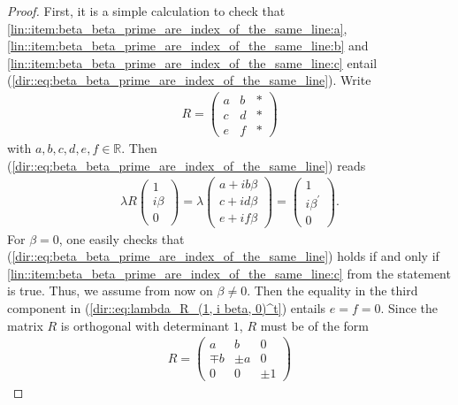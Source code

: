 \documentclass{amsart}
\newcommand{\R}{\mathbb{R}}
\begin{document}
\begin{proof}
    First, it is a simple calculation to check that \ref{lin::item:beta_beta_prime_are_index_of_the_same_line:a}, \ref{lin::item:beta_beta_prime_are_index_of_the_same_line:b} and \ref{lin::item:beta_beta_prime_are_index_of_the_same_line:c} entail (\ref{dir::eq:beta_beta_prime_are_index_of_the_same_line}). Write 
    \begin{align*}
        R = \begin{pmatrix}
            a & b & * \\
            c & d & * \\
            e & f & *
        \end{pmatrix}
    \end{align*}
    with $a, b, c, d, e, f \in \R$. Then (\ref{dir::eq:beta_beta_prime_are_index_of_the_same_line}) reads
    \begin{align} \label{dir::eq:lambda_R_(1, i beta, 0)^t}
        \lambda R \begin{pmatrix}
            1 \\ i \beta \\ 0
        \end{pmatrix}
        = \lambda \begin{pmatrix}
            a + i b \beta \\ c + i d \beta \\ e + if \beta
        \end{pmatrix}
        = \begin{pmatrix}
            1 \\ i \beta^\prime \\ 0
        \end{pmatrix}.
    \end{align}
    For $\beta = 0$, one easily checks that (\ref{dir::eq:beta_beta_prime_are_index_of_the_same_line}) holds if and only if \ref{lin::item:beta_beta_prime_are_index_of_the_same_line:c} from the statement is true.
    Thus, we assume from now on $\beta \neq 0$. Then the equality in the third component in (\ref{dir::eq:lambda_R_(1, i beta, 0)^t}) entails $e = f = 0$. Since the matrix $R$ is orthogonal with determinant $1$, $R$ must be of the form
    \begin{align*}
        R = \begin{pmatrix}
             a & b & 0 \\
            \mp b & \pm a & 0 \\
            0 & 0 & \pm 1
        \end{pmatrix}

\end{align*}
\end{proof}
\end{document}
